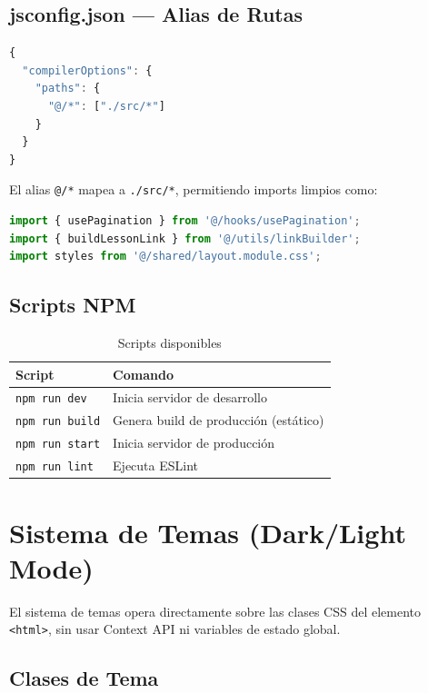\documentclass[12pt,a4paper]{article}
\begin{document}
\subsection{jsconfig.json --- Alias de Rutas}

\begin{lstlisting}[language=JavaScript, caption={jsconfig.json}]
{
  "compilerOptions": {
    "paths": {
      "@/*": ["./src/*"]
    }
  }
}
\end{lstlisting}

El alias \texttt{@/*} mapea a \texttt{./src/*}, permitiendo imports limpios como:

\begin{lstlisting}[language=JavaScript]
import { usePagination } from '@/hooks/usePagination';
import { buildLessonLink } from '@/utils/linkBuilder';
import styles from '@/shared/layout.module.css';
\end{lstlisting}

\subsection{Scripts NPM}

\begin{table}[h]
\centering
\begin{tabular}{ll}
\toprule
\textbf{Script} & \textbf{Comando} \\
\midrule
\texttt{npm run dev} & Inicia servidor de desarrollo \\
\texttt{npm run build} & Genera build de producción (estático) \\
\texttt{npm run start} & Inicia servidor de producción \\
\texttt{npm run lint} & Ejecuta ESLint \\
\bottomrule
\end{tabular}
\caption{Scripts disponibles}
\end{table}

\section{Sistema de Temas (Dark/Light Mode)}

El sistema de temas opera directamente sobre las clases CSS del elemento \texttt{<html>}, sin usar Context API ni variables de estado global.

\subsection{Clases de Tema}
\end{document}
